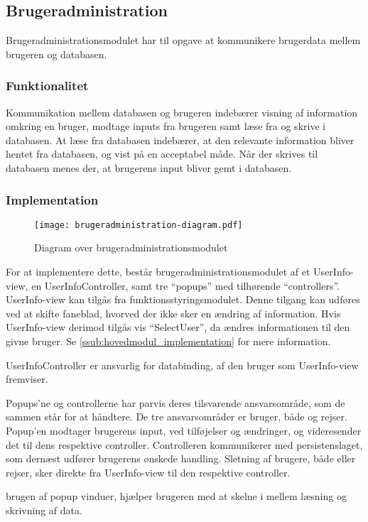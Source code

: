 \subsection{Brugeradministration}
\label{sub:Brugeradministration}

Brugeradministrationsmodulet har til opgave at kommunikere brugerdata mellem brugeren og databasen.

\subsubsection{Funktionalitet}
\label{ssub:Brugeradministration_funktionalitet}

Kommunikation mellem databasen og brugeren indebærer visning af information omkring en bruger, modtage inputs fra brugeren samt læse fra og skrive i databasen. At læse fra databasen indebærer, at den relevante information bliver hentet fra databasen, og vist på en acceptabel måde. Når der skrives til databasen menes der, at brugerens input bliver gemt i databasen.

\subsubsection{Implementation}
\label{ssub:Brugeradministration_implementation}

\begin{figure}
  \centering
  \texttt{[image: brugeradministration-diagram.pdf]}
  \caption{Diagram over brugeradministrationsmodulet}
  \label{fig:brugermod}
\end{figure}

For at implementere dette, består brugeradministrationsmodulet af et UserInfo-view, en UserInfoController, samt tre \enquote{popups} med tilhørende \enquote{controllers}. UserInfo-view kan tilgås fra funktionsstyringsmodulet. Denne tilgang kan udføres ved at skifte faneblad, hvorved der ikke sker en ændring af information. Hvis UserInfo-view derimod tilgås vis \enquote{SelectUser}, da ændres informationen til den givne bruger. Se \cref{ssub:hovedmodul_implementation} for mere information.

UserInfoController er ansvarlig for databinding, af den bruger som UserInfo-view fremviser.

Popups'ne og controllerne har parvis deres tilsvarende ansvarsområde, som de sammen står for at håndtere. De tre ansvarsområder er bruger, både og rejser. Popup'en modtager brugerens input, ved tilføjelser og ændringer, og videresender det til dens respektive controller. Controlleren kommunikerer med persistenslaget, som dernæst udfører brugerens ønskede handling. Sletning af brugere, både eller rejser, sker direkte fra UserInfo-view til den respektive controller.

brugen af popup vinduer, hjælper brugeren med at skelne i mellem læsning og skrivning af data.
